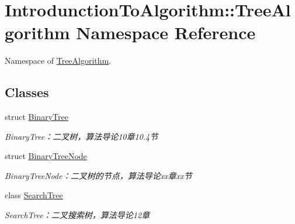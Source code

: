 \hypertarget{namespace_introdunction_to_algorithm_1_1_tree_algorithm}{}\section{Introdunction\+To\+Algorithm\+:\+:Tree\+Algorithm Namespace Reference}
\label{namespace_introdunction_to_algorithm_1_1_tree_algorithm}


Namespace of \hyperlink{namespace_introdunction_to_algorithm_1_1_tree_algorithm}{Tree\+Algorithm}.  


\subsection*{Classes}
\begin{DoxyCompactItemize}
\item 
struct \hyperlink{struct_introdunction_to_algorithm_1_1_tree_algorithm_1_1_binary_tree}{Binary\+Tree}
\begin{DoxyCompactList}\small\item\em Binary\+Tree：二叉树，算法导论10章10.4节 \end{DoxyCompactList}\item 
struct \hyperlink{struct_introdunction_to_algorithm_1_1_tree_algorithm_1_1_binary_tree_node}{Binary\+Tree\+Node}
\begin{DoxyCompactList}\small\item\em Binary\+Tree\+Node：二叉树的节点，算法导论xx章xx节 \end{DoxyCompactList}\item 
class \hyperlink{class_introdunction_to_algorithm_1_1_tree_algorithm_1_1_search_tree}{Search\+Tree}
\begin{DoxyCompactList}\small\item\em Search\+Tree：二叉搜索树，算法导论12章 \end{DoxyCompactList}\end{DoxyCompactItemize}
